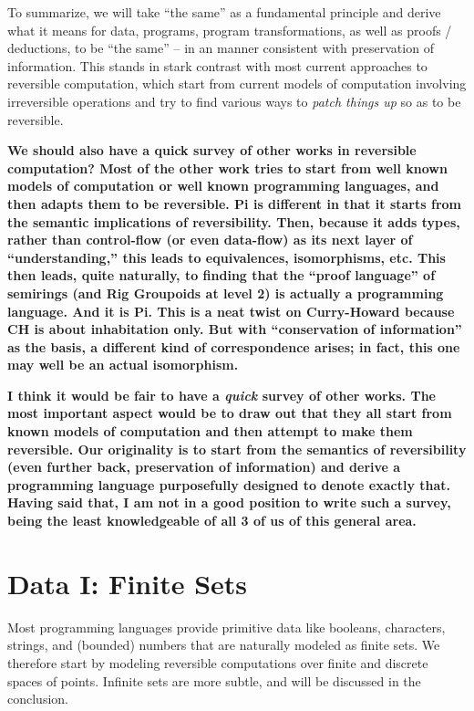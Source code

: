 \documentclass{article}
\newcommand{\amr}[1]{\fbox{Amr says:} \textbf{#1}}
\newcommand{\jc}[1]{\fbox{Jacques says:} \textbf{#1}}
\begin{document}
To summarize, we will take ``the same'' as a fundamental principle and
derive what it means for data, programs, program transformations, as
well as proofs / deductions, to be ``the same'' -- in an manner
consistent with preservation of information. This stands in stark
contrast with most current approaches to reversible computation, which
start from current models of computation involving irreversible
operations and try to find various ways to \emph{patch things up} so
as to be reversible.

\amr{We should also have a quick survey of other works in reversible
computation? Most of the other work tries to start from well known
models of computation or well known programming languages, and then
adapts them to be reversible. Pi is different in that it starts from
the semantic implications of reversibility. Then, because it adds
types, rather than control-flow (or even data-flow) as its next layer
of ``understanding,'' this leads to equivalences, isomorphisms, etc.
This then leads, quite naturally, to finding that the ``proof
language'' of semirings (and Rig Groupoids at level 2) is actually a
programming language. And it is Pi. This is a neat twist on
Curry-Howard because CH is about \textbf{inhabitation} only. But with
``conservation of information'' as the basis, a different kind of
correspondence arises; in fact, this one may well be an actual
isomorphism.}

\jc{I think it would be fair to have a \textit{quick} survey
of other works. The most important aspect would be to draw out that
they all start from known models of computation and then attempt to
make them reversible.  Our originality is to start from the semantics
of reversibility (even further back, preservation of information)
and derive a programming language purposefully designed to denote
exactly that. Having said that, I am not in a good position to
write such a survey, being the least knowledgeable of all 3 of us
of this general area.}

\section{Data I: Finite Sets}
\label{sec:dataone}

Most programming languages provide primitive data like booleans,
characters, strings, and (bounded) numbers that are naturally modeled
as finite sets. We therefore start by modeling reversible computations
over finite and discrete spaces of points. Infinite sets are more
subtle, and will be discussed in the conclusion.
\end{document}
